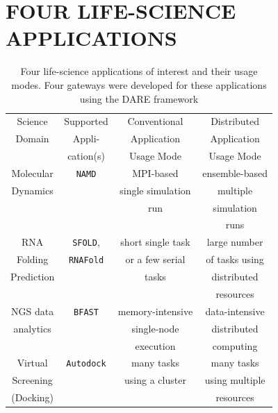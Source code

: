 \documentclass{sig-alternate}
\begin{document}


\section{FOUR LIFE-SCIENCE APPLICATIONS}

\begin{table}
 \small
\begin{tabular}{|c|c|c|c|} 
  \hline Science  & Supported  & Conventional   &   Distributed
  \\
  Domain & Appli- & Application & Application \\ 
  &  cation(s) & Usage Mode & Usage Mode \\  \hline \hline 
  
  Molecular   &  \texttt{NAMD} &  MPI-based  & ensemble-based   \\
  Dynamics  &  & single simulation  & multiple  \\ 
  &  & run &  simulation  \\ 
  &  &  &  runs \\ \hline
  RNA   & \texttt{SFOLD}, & short single task    & large number  \\
  Folding   & \texttt{RNAFold} & or a few serial & of tasks using   \\
  Prediction & &  tasks &distributed \\
  &  &  &   resources  \\ \hline
  NGS data     &  \texttt{BFAST} & memory-intensive  & data-intensive\\ 
  analytics  &  &  single-node   &  distributed  \\
  & & execution  & computing \\ \hline
  Virtual  & \texttt{Autodock} &  many tasks   & many tasks \\
  Screening  &  & using a cluster  & using multiple  \\
  (Docking) &  &  & resources \\ \hline
  \hline
\end{tabular} \caption{Four life-science applications of interest and their usage modes.  Four gateways were developed for these applications using the DARE framework}
 \label{table:four-applications} 
\end{table}
\end{document}
